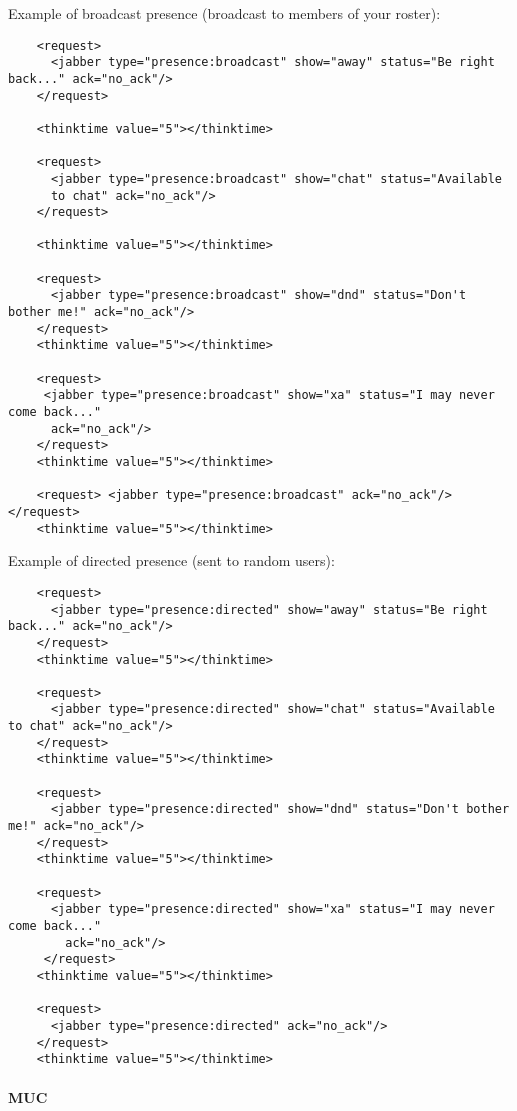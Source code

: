 \documentclass{TSUNG-en}
\begin{document}
Example of broadcast presence (broadcast to members of your roster):
\begin{Verbatim}
    <request>
      <jabber type="presence:broadcast" show="away" status="Be right back..." ack="no_ack"/>
    </request>

    <thinktime value="5"></thinktime>

    <request>
      <jabber type="presence:broadcast" show="chat" status="Available
      to chat" ack="no_ack"/>
    </request>

    <thinktime value="5"></thinktime>

    <request>
      <jabber type="presence:broadcast" show="dnd" status="Don't bother me!" ack="no_ack"/>
    </request>
    <thinktime value="5"></thinktime>

    <request>
     <jabber type="presence:broadcast" show="xa" status="I may never come back..."
      ack="no_ack"/>
    </request>
    <thinktime value="5"></thinktime>

    <request> <jabber type="presence:broadcast" ack="no_ack"/> </request>
    <thinktime value="5"></thinktime>
\end{Verbatim}

Example of directed presence (sent to random  users):
\begin{Verbatim}
    <request>
      <jabber type="presence:directed" show="away" status="Be right back..." ack="no_ack"/>
    </request>
    <thinktime value="5"></thinktime>

    <request>
      <jabber type="presence:directed" show="chat" status="Available to chat" ack="no_ack"/>
    </request>
    <thinktime value="5"></thinktime>

    <request>
      <jabber type="presence:directed" show="dnd" status="Don't bother me!" ack="no_ack"/>
    </request>
    <thinktime value="5"></thinktime>

    <request>
      <jabber type="presence:directed" show="xa" status="I may never come back..."
        ack="no_ack"/>
     </request>
    <thinktime value="5"></thinktime>

    <request>
      <jabber type="presence:directed" ack="no_ack"/>
    </request>
    <thinktime value="5"></thinktime>
\end{Verbatim}

\paragraph{MUC}
\end{document}
